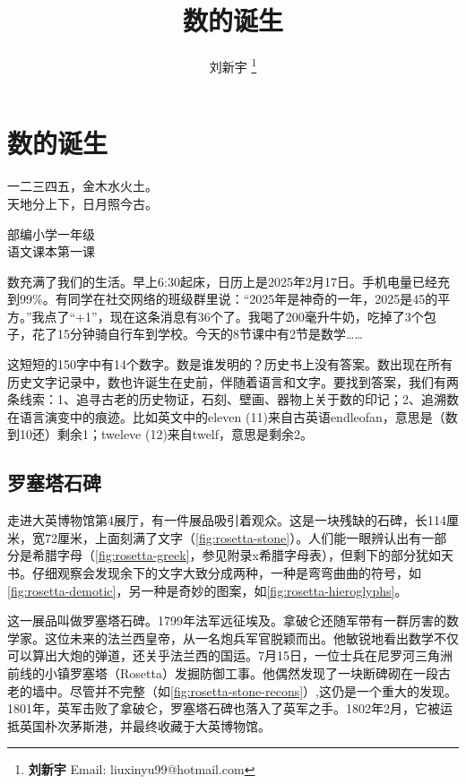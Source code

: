 \documentclass[b5paper]{ctexart}
\begin{document}
\title{数的诞生}

\author{刘新宇
\thanks{{\bfseries 刘新宇} \newline
  Email: liuxinyu99@hotmail.com \newline}
  }

\maketitle
\fi


\ifx\wholebook\relax
\chapter{数的诞生}
\fi

\epigraph{一二三四五，金木水火土。\\ 
天地分上下，日月照今古。}{部编小学一年级\\
语文课本第一课}

数充满了我们的生活。早上6:30起床，日历上是2025年2月17日。手机电量已经充到99\%。有同学在社交网络的班级群里说：“2025年是神奇的一年，2025是45的平方。”我点了“+1”，现在这条消息有36个\heartsuit{}了。我喝了200毫升牛奶，吃掉了3个包子，花了15分钟骑自行车到学校。今天的8节课中有2节是数学……

这短短的150字中有14个数字。数是谁发明的？历史书上没有答案。数出现在所有历史文字记录中，数也许诞生在史前，伴随着语言和文字。要找到答案，我们有两条线索：1、追寻古老的历史物证，石刻、壁画、器物上关于数的印记；2、追溯数在语言演变中的痕迹。比如英文中的eleven (11)来自古英语endleofan，意思是（数到10还）剩余1；tweleve (12)来自twelf，意思是剩余2。

\section{罗塞塔石碑}

走进大英博物馆第4展厅，有一件展品吸引着观众。这是一块残缺的石碑，长114厘米，宽72厘米，上面刻满了文字（\cref{fig:rosetta-stone}）。人们能一眼辨认出有一部分是希腊字母（\cref{fig:rosetta-greek}，参见附录x希腊字母表），但剩下的部分犹如天书。仔细观察会发现余下的文字大致分成两种，一种是弯弯曲曲的符号，如\cref{fig:rosetta-demotic}，另一种是奇妙的图案，如\cref{fig:rosetta-hieroglyphs}。

这一展品叫做罗塞塔石碑。1799年法军远征埃及。拿破仑还随军带有一群厉害的数学家。这位未来的法兰西皇帝，从一名炮兵军官脱颖而出。他敏锐地看出数学不仅可以算出大炮的弹道，还关乎法兰西的国运。7月15日，一位士兵在尼罗河三角洲前线的小镇罗塞塔（Rosetta）发掘防御工事。他偶然发现了一块断碑砌在一段古老的墙中。尽管并不完整（如\cref{fig:rosetta-stone-recons}）,这仍是一个重大的发现。1801年，英军击败了拿破仑，罗塞塔石碑也落入了英军之手。1802年2月，它被运抵英国朴次茅斯港，并最终收藏于大英博物馆。
\end{document}
